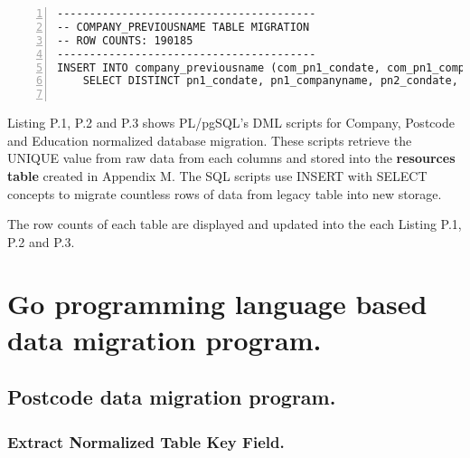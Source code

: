 \begin{lstlisting}[breaklines, frame=single, numbers=left, caption={PL/pgSQL's DML Script for Company Normalized Database Migration.}, label=commandline-02]
----------------------------------------
-- COMPANY_PREVIOUSNAME TABLE MIGRATION 
-- ROW COUNTS: 190185
----------------------------------------
INSERT INTO company_previousname (com_pn1_condate, com_pn1_companyname, com_pn2_condate, com_pn2_companyname, com_pn3_condate, com_pn3_companyname, com_pn4_condate, com_pn4_companyname, com_pn5_condate, com_pn5_companyname, com_pn6_condate, com_pn6_companyname, com_pn7_condate, com_pn7_companyname, com_pn8_condate, com_pn8_companyname, com_pn9_condate, com_pn9_companyname, com_pn10_condate, com_pn10_companyname) 
	SELECT DISTINCT pn1_condate, pn1_companyname, pn2_condate, pn2_companyname, pn3_condate, pn3_companyname, pn4_condate, pn4_companyname, pn5_condate, pn5_companyname, pn6_condate, pn6_companyname,pn7_condate, pn7_companyname, pn8_condate, pn8_companyname, pn9_condate, pn9_companyname, pn10_condate, pn10_companyname FROM company_rawdata;


\end{lstlisting}

Listing P.1, P.2 and P.3 shows PL/pgSQL's DML scripts for Company, Postcode and Education normalized database migration. These scripts retrieve the UNIQUE value from raw data from each columns and stored into the \textbf{resources table} created in Appendix M. The SQL scripts use INSERT with SELECT concepts to migrate countless rows of data from legacy table into new storage. 

The row counts of each table are displayed and updated into the each Listing P.1, P.2 and P.3. 

\newpage

\section{Go programming language based data migration program.}

\subsection{Postcode data migration program. }

\subsubsection{Extract Normalized Table Key Field.}


